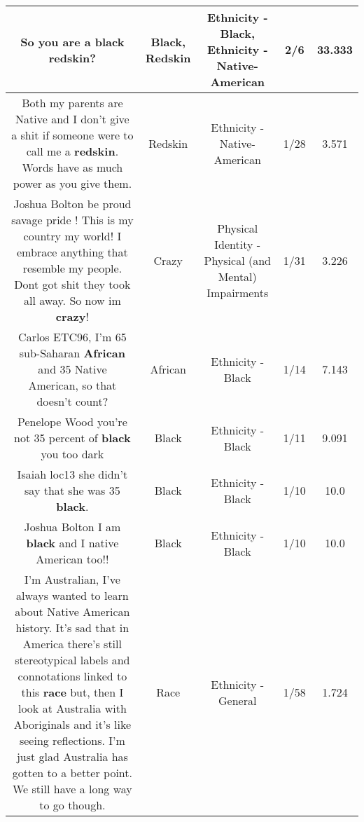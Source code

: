 \documentclass[11pt]{article}
\newlength\mylength
\begin{document}
\begin{center}
\begin{longtable}{|C{.65\mylength}|C{.30\mylength}|C{.12\mylength}|C{.12\mylength}|C{.12\mylength}|}
  \small So you are a \textbf{black} \textbf{redskin}?\normalsize   & Black, Redskin & Ethnicity - Black, Ethnicity - Native-American & 2/6 & 33.333 \\  \hline
  \small Both my parents are Native and I don't give a shit if someone were to call me a \textbf{redskin}. Words have as much power as you give them.\normalsize   & Redskin & Ethnicity - Native-American & 1/28 & 3.571 \\  \hline
  \small Joshua Bolton be proud savage pride ! This is my country my world! I embrace anything that resemble my people. Dont got shit they took all away. So now im \textbf{crazy}!\normalsize   & Crazy & Physical Identity - Physical (and Mental) Impairments & 1/31 & 3.226 \\  \hline
  \small Carlos ETC96, I'm 65 sub-Saharan \textbf{African} and 35 Native American, so that doesn't count?\normalsize   & African & Ethnicity - Black & 1/14 & 7.143 \\  \hline
  \small Penelope Wood you're not 35 percent of \textbf{black}  you too dark\normalsize   & Black & Ethnicity - Black & 1/11 & 9.091 \\  \hline
  \small Isaiah loc13 she didn't say that she was 35 \textbf{black}.\normalsize   & Black & Ethnicity - Black & 1/10 & 10.0 \\  \hline
  \small Joshua Bolton I am \textbf{black} and I native American too!!\normalsize   & Black & Ethnicity - Black & 1/10 & 10.0 \\  \hline
  \small I'm Australian, I've always wanted to learn about Native American history. It's sad that in America there's still stereotypical labels and connotations linked to this \textbf{race} but, then I look at Australia with Aboriginals and it's like seeing reflections. I'm just glad Australia has gotten to a better point. We still have a long way to go though.\normalsize   & Race & Ethnicity - General & 1/58 & 1.724 \\  \hline

\end{longtable}
\end{center}
\end{document}
